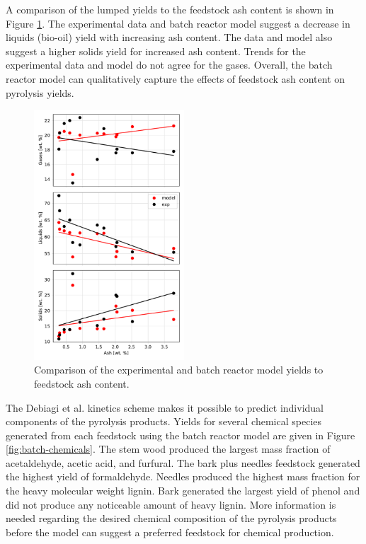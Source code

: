 A comparison of the lumped yields to the feedstock ash content is shown in Figure \ref{fig:batch-exp2}. The experimental data and batch reactor model suggest a decrease in liquids (bio-oil) yield with increasing ash content. The data and model also suggest a higher solids yield for increased ash content. Trends for the experimental data and model do not agree for the gases. Overall, the batch reactor model can qualitatively capture the effects of feedstock ash content on pyrolysis yields.

\begin{figure}[H]
    \centering
    \includegraphics[width=0.5\textwidth]{figures/batch-exp2.pdf}
    \caption{Comparison of the experimental and batch reactor model yields to feedstock ash content.}
    \label{fig:batch-exp2}
\end{figure}

The Debiagi et al. kinetics scheme makes it possible to predict individual components of the pyrolysis products. Yields for several chemical species generated from each feedstock using the batch reactor model are given in Figure \ref{fig:batch-chemicals}. The stem wood produced the largest mass fraction of acetaldehyde, acetic acid, and furfural. The bark plus needles feedstock generated the highest yield of formaldehyde. Needles produced the highest mass fraction for the heavy molecular weight lignin. Bark generated the largest yield of phenol and did not produce any noticeable amount of heavy lignin. More information is needed regarding the desired chemical composition of the pyrolysis products before the model can suggest a preferred feedstock for chemical production.


